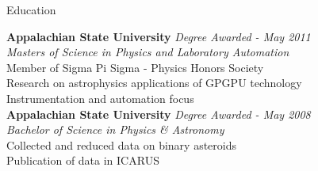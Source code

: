\documentclass{cv} %
\begin{document}

\begin{rSection}{Education}

{\bf Appalachian State University} \hfill {\em Degree Awarded - May 2011} \\ 
{\em Masters of Science in Physics and Laboratory Automation} \\
Member of Sigma Pi Sigma - Physics Honors Society \\
Research on astrophysics applications of GPGPU technology \\
Instrumentation and automation focus \\

{\bf Appalachian State University} \hfill {\em Degree Awarded - May 2008} \\ 
{\em Bachelor of Science in Physics \& Astronomy} \\
Collected and reduced data on binary asteroids \\
Publication of data in ICARUS \\
\end{rSection}

\end{document}
